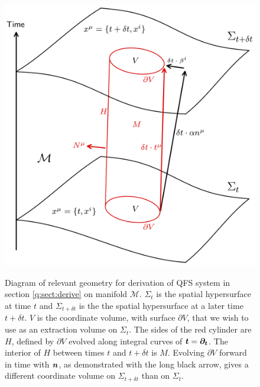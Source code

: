 \begin{figure}[h]
{\includegraphics[width=0.6\columnwidth]{png/qfs_simple.png}}
\caption{Diagram of relevant geometry for derivation of QFS system in section \ref{q:sect:derive} on manifold $\mathcal{M}$. $\Sigma_t$ is the spatial hypersurface at time $t$ and $\Sigma_{t+\delta t}$ is the the spatial hypersurface at a later time $t+\delta t$. $V$ is the coordinate volume, with surface $\partial V$, that we wish to use as an extraction volume on $\Sigma_t$. The sides of the red cylinder are $H$, defined by $\partial V$ evolved along integral curves of $\boldsymbol{t}=\boldsymbol{\partial_t}$. The interior of $H$ between times $t$ and $t+\delta t$ is $M$. Evolving $\partial V$ forward in time with $\boldsymbol n$, as demonstrated with the long black arrow, gives a different coordinate volume on $\Sigma_{t+\delta t}$ than on $\Sigma_t$.}
\label{q:fig:qfs_geometry}
\end{figure}

